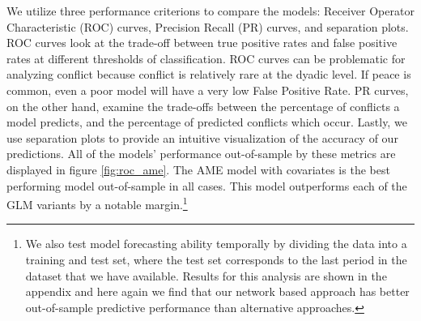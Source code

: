 We utilize three performance criterions to compare the models: Receiver Operator Characteristic (ROC) curves, Precision Recall (PR) curves, and separation plots. ROC curves look at the trade-off between true positive rates and false positive rates at different thresholds of classification. ROC curves can be problematic for analyzing conflict because conflict is relatively rare at the dyadic level. If peace is common, even a poor model will have a very low False Positive Rate. PR curves, on the other hand, examine the trade-offs between the percentage of conflicts a model predicts, and the percentage of predicted conflicts which occur. Lastly, we use separation plots to provide an intuitive visualization of the accuracy of our predictions. All of the models' performance out-of-sample by these metrics are displayed in figure \ref{fig:roc_ame}. The AME model with covariates is the best performing model out-of-sample in all cases. This model outperforms each of the GLM variants by a notable margin.\footnote{We also test model forecasting ability temporally by dividing the data into a training and test set, where the test set corresponds to the last period in the dataset that we have available. Results for this analysis are shown in the appendix and here again we find that our network based approach has better out-of-sample predictive performance than alternative approaches.}

\FloatBarrier